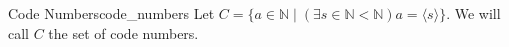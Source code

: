 \begin{definition}
{Code Numbers}{code_numbers}
Let \(C = \{a \in \mathbb{N} \mid(\exists s \in \mathbb{N}<\mathbb{N}) a =
\langle s\rangle\}\). We will call \(C\) the set of code numbers.
\end{definition}
